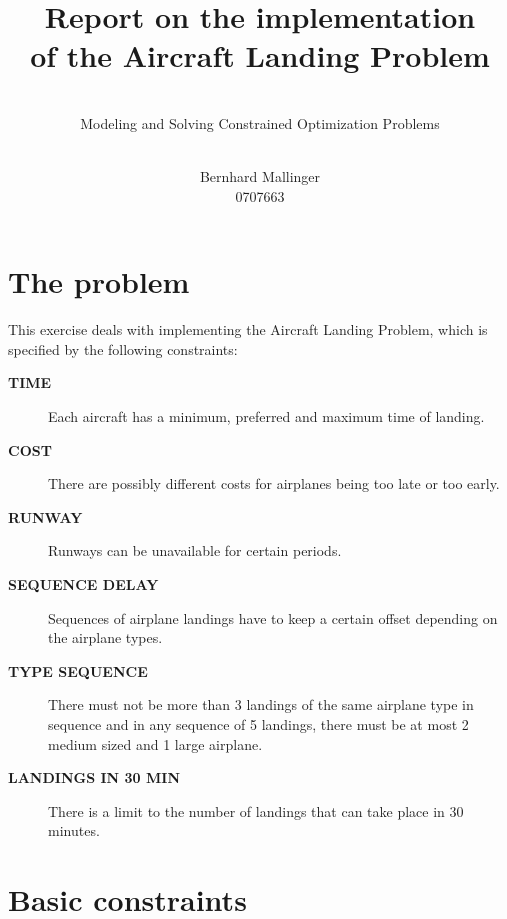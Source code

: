 \documentclass[,%
			paper=a4,%
			DIV11,
			liststotoc,
			bibtotoc,
			draft=false,%
			numbers=noendperiod
			]{scrartcl}
\title{Report on the implementation\\of the Aircraft Landing Problem}
\subtitle{\hfill \\ Modeling and Solving Constrained Optimization Problems}
\author{\hfill \\ Bernhard Mallinger \\ 0707663}
\begin{document}
\maketitle


\section{The problem}

This exercise deals with implementing the Aircraft Landing Problem, which is specified by the following constraints:

\newcommand{\constr}[1]{\textbf{\textsf{#1}}}
\newcommand{\Ctime}{\constr{TIME}}
\newcommand{\Ccost}{\constr{COST}}
\newcommand{\Crunway}{\constr{RUNWAY}}
\newcommand{\CseqDel}{\constr{SEQUENCE DELAY}}
\newcommand{\CtypeSeq}{\constr{TYPE SEQUENCE}}
\newcommand{\Clandings}{\constr{LANDINGS IN 30 MIN}}
\begin{description}
	\item[\Ctime] Each aircraft has a minimum, preferred and maximum time of landing.
	\item[\Ccost] There are possibly different costs for airplanes being too late or too early.
	\item[\Crunway] Runways can be unavailable for certain periods.
	\item[\CseqDel] Sequences of airplane landings have to keep a certain offset depending on the airplane types.
	\item[\CtypeSeq] There must not be more than 3 landings of the same airplane type in sequence and in any sequence of 5 landings, there must be at most 2 medium sized and 1 large airplane.
	\item[\Clandings] There is a limit to the number of landings that can take place in 30 minutes.

\end{description}

\section{Basic constraints}

\end{document}
